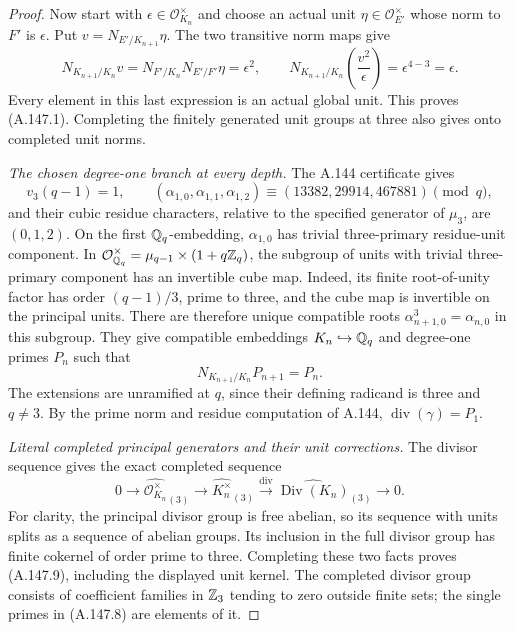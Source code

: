 \begin{proof}
Now start with \(\epsilon\in\mathcal O_{K_n}^\times\)
and choose an actual unit \(\eta\in\mathcal O_{E'}^\times\)
whose norm to \(F'\) is \(\epsilon\).
Put \(v=N_{E'/K_{n+1}}\eta\).
The two transitive norm maps give
\[
 N_{K_{n+1}/K_n}v
   =N_{F'/K_n}N_{E'/F'}\eta
   =\epsilon^2,
 \qquad
 N_{K_{n+1}/K_n}\left(\frac{v^2}{\epsilon}\right)
   =\epsilon^{4-3}=\epsilon.
\tag{A.147.6}
\]
Every element in this last expression is an actual
global unit.  This proves (A.147.1).
Completing the finitely generated unit groups at three
also gives onto completed unit norms.

\emph{The chosen degree-one branch at every depth.}
The A.144 certificate gives
\[
 v_3(q-1)=1,
 \qquad (\alpha_{1,0},\alpha_{1,1},\alpha_{1,2})
             \equiv(13382,29914,467881)\pmod q,
\tag{A.147.7}
\]
and their cubic residue characters, relative to the
specified generator of \(\mu_3\), are \((0,1,2)\).
On the first \(\mathbb Q_q\)-embedding, \(\alpha_{1,0}\)
has trivial three-primary residue-unit component.
In
\(\mathcal O_{\mathbb Q_q}^\times=\mu_{q-1}\times(1+q\mathbb Z_q)\),
the subgroup of units with trivial three-primary
component has an invertible cube map.
Indeed, its finite root-of-unity factor has order
\((q-1)/3\), prime to three, and the cube map is
invertible on the principal units.
There are therefore unique compatible roots
\(\alpha_{n+1,0}^3=\alpha_{n,0}\) in this subgroup.
They give compatible embeddings \(K_n\hookrightarrow\mathbb Q_q\)
and degree-one primes \(P_n\) such that
\[
                    N_{K_{n+1}/K_n}P_{n+1}=P_n.
\tag{A.147.8}
\]
The extensions are unramified at \(q\), since their
defining radicand is three and \(q\ne3\).
By the prime norm and residue computation of A.144,
\(\operatorname{div}(\gamma)=P_1\).

\emph{Literal completed principal generators and their unit corrections.}
The divisor sequence gives the exact completed sequence
\[
 0\longrightarrow\widehat{\mathcal O_{K_n}^\times}_{(3)}
 \longrightarrow\widehat{K_n^\times}_{(3)}
 \xrightarrow{\operatorname{div}}
 \widehat{\operatorname{Div}(K_n)}_{(3)}
 \longrightarrow0.
\tag{A.147.9}
\]
For clarity, the principal divisor group is free abelian,
so its sequence with units splits as a sequence of
abelian groups.  Its inclusion in the full divisor
group has finite cokernel of order prime to three.
Completing these two facts proves (A.147.9), including
the displayed unit kernel.
The completed divisor group consists of coefficient
families in \(\mathbb Z_3\) tending to zero outside finite
sets; the single primes in (A.147.8) are elements of it.


\end{proof}
